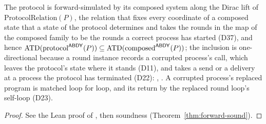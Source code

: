 \begin{theorem}
  \label{thm:aba-protocol-composed}
  \leanok
  The protocol is forward-simulated by its composed system along the Dirac lift of $\mathrm{ProtocolRelation}(P)$, the relation that fixes every coordinate of a composed state that a state of the protocol determines and takes the rounds in the map of the composed family to be the rounds a correct process has started (D37), and hence $\operatorname{ATD}(\mathrm{protocol}^{\mathsf{ABDY}}(P)) \subseteq \operatorname{ATD}(\mathrm{composed}^{\mathsf{ABDY}}(P))$; the inclusion is one-directional because a round instance records a corrupted process's call, which leaves the protocol's state where it stands (D11), and takes a send or a delivery at a process the protocol has terminated (D22): , .
  A corrupted process's replaced program is matched loop for loop, and its return by the replaced round loop's self-loop (D23).
\end{theorem}

\begin{proof}\leanok
  See the Lean proof of , then soundness (Theorem~\ref{thm:forward-sound}).
\end{proof}
